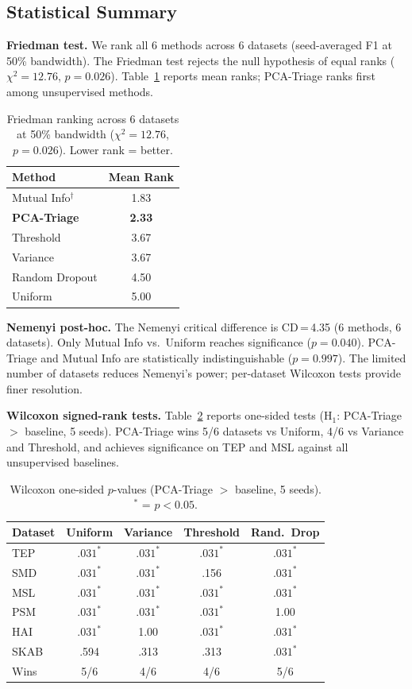 \documentclass[journal]{IEEEtran}
\begin{document}
\subsection{Statistical Summary}

\textbf{Friedman test.} We rank all 6 methods across 6 datasets (seed-averaged F1 at 50\% bandwidth). The Friedman test rejects the null hypothesis of equal ranks ($\chi^2 = 12.76$, $p = 0.026$). Table~\ref{tab:statistical} reports mean ranks; PCA-Triage ranks first among unsupervised methods.

\begin{table}[t]
\centering
\caption{Friedman ranking across 6 datasets at 50\% bandwidth ($\chi^2 = 12.76$, $p = 0.026$). Lower rank = better.}
\begin{tabular}{@{}lc@{}}
\toprule
\textbf{Method} & \textbf{Mean Rank} \\
\midrule
Mutual Info$^\dagger$ & 1.83 \\
\textbf{PCA-Triage} & \textbf{2.33} \\
Threshold & 3.67 \\
Variance & 3.67 \\
Random Dropout & 4.50 \\
Uniform & 5.00 \\
\bottomrule
\end{tabular}
\label{tab:statistical}
\end{table}

\textbf{Nemenyi post-hoc.} The Nemenyi critical difference is CD\,=\,4.35 (6 methods, 6 datasets). Only Mutual Info vs.\ Uniform reaches significance ($p = 0.040$). PCA-Triage and Mutual Info are statistically indistinguishable ($p = 0.997$). The limited number of datasets reduces Nemenyi's power; per-dataset Wilcoxon tests provide finer resolution.

\textbf{Wilcoxon signed-rank tests.} Table~\ref{tab:wilcoxon} reports one-sided tests (H$_1$: PCA-Triage $>$ baseline, 5 seeds). PCA-Triage wins 5/6 datasets vs Uniform, 4/6 vs Variance and Threshold, and achieves significance on TEP and MSL against all unsupervised baselines.

\begin{table}[t]
\centering
\caption{Wilcoxon one-sided $p$-values (PCA-Triage $>$ baseline, 5 seeds). $^*$ = $p < 0.05$.}
\begin{tabular}{@{}lcccc@{}}
\toprule
\textbf{Dataset} & \textbf{Uniform} & \textbf{Variance} & \textbf{Threshold} & \textbf{Rand.\ Drop} \\
\midrule
TEP & $.031^*$ & $.031^*$ & $.031^*$ & $.031^*$ \\
SMD & $.031^*$ & $.031^*$ & .156 & $.031^*$ \\
MSL & $.031^*$ & $.031^*$ & $.031^*$ & $.031^*$ \\
PSM & $.031^*$ & $.031^*$ & $.031^*$ & 1.00 \\
HAI & $.031^*$ & 1.00 & $.031^*$ & $.031^*$ \\
SKAB & .594 & .313 & .313 & $.031^*$ \\
\midrule
Wins & 5/6 & 4/6 & 4/6 & 5/6 \\
\bottomrule
\end{tabular}
\label{tab:wilcoxon}
\end{table}
\end{document}
